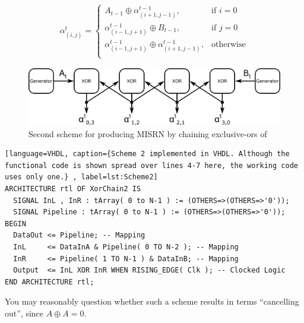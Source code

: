 \documentclass{article}
\newcommand{\xor}{\oplus}
\begin{document}
\begin{align}
\alpha^t_{(i,j)} = 
\begin{cases}
A_{t-1} \xor \alpha^{t-1}_{(i+1,j-1)}, & \text{if $i=0$}\\
\alpha^{t-1}_{(i-1,j+1)} \xor B_{t-1}, & \text{if $j=0$}\\
\alpha^{t-1}_{(i-1,j+1)} \xor \alpha^{t-1}_{(i+1,j-1)}, & \text{otherwise}\\
\end{cases}
\end{align}

\begin{figure}[ht]
\centering
\includegraphics[width=\textwidth]{MISRN2.png}
\caption{Second scheme for producing MISRN by chaining exclusive-ors of }
\label{fig:scheme2}
\end{figure}

\begin{minipage}{1.0\textwidth}
\centering
\begin{lstlisting}[language=VHDL, caption={Scheme 2 implemented in VHDL. Although the functional code is shown spread over lines 4-7 here, the working code uses only one.} , label=lst:Scheme2]
ARCHITECTURE rtl OF XorChain2 IS
  SIGNAL InL , InR : tArray( 0 to N-1 ) := (OTHERS=>(OTHERS=>'0'));
  SIGNAL Pipeline : tArray( 0 to N-1 ) := (OTHERS=>(OTHERS=>'0'));
BEGIN
  DataOut <= Pipeline; -- Mapping
  InL     <= DataInA & Pipeline( 0 TO N-2 ); -- Mapping
  InR     <= Pipeline( 1 TO N-1 ) & DataInB; -- Mapping
  Output  <= InL XOR InR WHEN RISING_EDGE( Clk ); -- Clocked Logic
END ARCHITECTURE rtl;
\end{lstlisting}
\end{minipage}

You may reasonably question whether such a scheme results in terms ``cancelling out'', since $A \xor A = 0$.  
\end{document}
